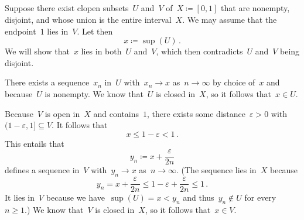 \subsection{}

Suppose there exist clopen subsets~$U$ and~$V$ of~$X ≔ [0, 1]$ that are nonempty, disjoint, and whose union is the entire interval~$X$.
We may assume that the endpoint~$1$ lies in~$V$.
Let then
\[
	x ≔ \sup(U) \,.
\]
We will show that~$x$ lies in both~$U$ and~$V$, which then contradicts~$U$ and~$V$ being disjoint.

There exists a sequence~$x_n$ in~$U$ with~$x_n \to x$ as~$n \to ∞$ by choice of~$x$ and because~$U$ is nonempty.
We know that~$U$ is closed in~$X$, so it follows that~$x ∈ U$.

Because~$V$ is open in~$X$ and contains~$1$, there exists some distance~$ε > 0$ with~$(1 - ε, 1] ⊆ V$.
It follows that
\[
	x ≤ 1 - ε < 1 \,.
\]
This entails that
\[
	y_n ≔ x + \frac{ε}{2n}
\]
defines a sequence in~$V$ with~$y_n \to x$ as~$n \to ∞$.
(The sequence lies in~$X$ because
\[
	y_n
	=
	x + \frac{ε}{2n}
	≤
	1 - ε + \frac{ε}{2n}
	≤
	1 \,.
\]
It lies in~$V$ because we have~$\sup(U) = x < y_n$ and thus~$y_n ∉ U$ for every~$n ≥ 1$.)
We know that~$V$ is closed in~$X$, so it follows that~$x ∈ V$.
